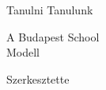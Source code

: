 \begin{titlepage} %

	\centering %
	
	\scshape %
	
	\vspace*{\baselineskip} %
	
	
	
	\vspace{0.75\baselineskip} %
	
	{\LARGE Tanulni Tanulunk\\} %
	
	\vspace{0.75\baselineskip} %
	
	
	\vspace{2\baselineskip} %
	
	
	
    A Budapest School\\
    Modell
	
	\vspace*{3\baselineskip} %
	
	
	Szerkesztette
	
	\vspace{0.5\baselineskip} %
	

\end{titlepage}
